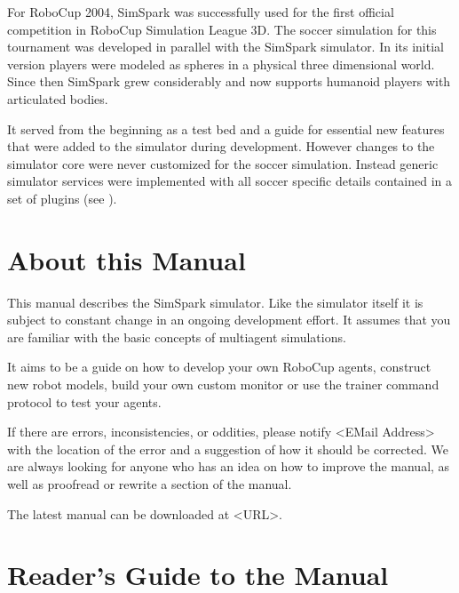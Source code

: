 For RoboCup 2004, SimSpark was successfully used for the first
official competition in RoboCup Simulation League 3D.  The soccer
simulation for this tournament was developed in parallel with the
SimSpark simulator. In its initial version players were modeled as
spheres in a physical three dimensional world. Since then SimSpark
grew considerably and now supports humanoid players with
articulated bodies.

It served from the beginning as a test bed and a guide for essential
new features that were added to the simulator during
development. However changes to the simulator core were never
customized for the soccer simulation. Instead generic
simulator services were implemented with all soccer specific
details contained in a set of plugins (see \cite{OR05}).

\section{About this Manual}


This manual describes the SimSpark simulator. Like the simulator
itself it is subject to constant change in an ongoing development
effort. It assumes that you are familiar with the basic concepts of
multiagent simulations.

It aims to be a guide on how to develop your own RoboCup agents,
construct new robot models, build your own custom monitor or use the
trainer command protocol to test your agents.

If there are errors, inconsistencies, or oddities, please notify
<EMail Address> with the location of the error and a suggestion of how
it should be corrected. We are always looking for anyone who has an
idea on how to improve the manual, as well as proofread or rewrite a
section of the manual.

The latest manual can be downloaded at <URL>.

\section{Reader's Guide to the Manual}




